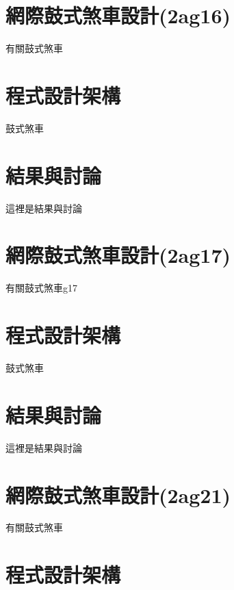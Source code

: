 \documentclass[]{article}
\begin{document}
\section{網際鼓式煞車設計(2ag16)}\label{ux7db2ux969bux9f13ux5f0fux715eux8ecaux8a2dux8a082ag16}

有關鼓式煞車

\section{程式設計架構}\label{ux7a0bux5f0fux8a2dux8a08ux67b6ux69cb-11}

鼓式煞車

\section{結果與討論}\label{ux7d50ux679cux8207ux8a0eux8ad6-12}

這裡是結果與討論

\section{網際鼓式煞車設計(2ag17)}\label{ux7db2ux969bux9f13ux5f0fux715eux8ecaux8a2dux8a082ag17}

有關鼓式煞車g17

\section{程式設計架構}\label{ux7a0bux5f0fux8a2dux8a08ux67b6ux69cb-12}

鼓式煞車

\section{結果與討論}\label{ux7d50ux679cux8207ux8a0eux8ad6-13}

這裡是結果與討論

\section{網際鼓式煞車設計(2ag21)}\label{ux7db2ux969bux9f13ux5f0fux715eux8ecaux8a2dux8a082ag21}

有關鼓式煞車

\section{程式設計架構}\label{ux7a0bux5f0fux8a2dux8a08ux67b6ux69cb-13}
\end{document}
